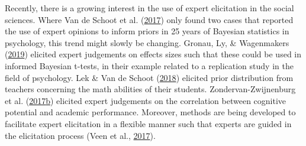 \documentclass[openright,titlepage,12pt,a4paper]{book}
\begin{document}
Recently, there is a growing interest in the use of expert elicitation in the social sciences. Where Van de Schoot et al. (\protect\hyperlink{ref-van_de_schoot_systematic_2017}{2017}) only found two cases that reported the use of expert opinions to inform priors in 25 years of Bayesian statistics in psychology, this trend might slowly be changing. Gronau, Ly, \& Wagenmakers (\protect\hyperlink{ref-gronau_informed_2019}{2019}) elicited expert judgements on effects sizes such that these could be used in informed Bayesian t-tests, in their example related to a replication study in the field of psychology. Lek \& Van de Schoot (\protect\hyperlink{ref-lek_development_2018}{2018}) elicited prior distribution from teachers concerning the math abilities of their students. Zondervan-Zwijnenburg et al. (\protect\hyperlink{ref-zondervan-zwijnenburg_application_2017}{2017}\protect\hyperlink{ref-zondervan-zwijnenburg_application_2017}{b}) elicited expert judgements on the correlation between cognitive potential and academic performance. Moreover, methods are being developed to facilitate expert elicitation in a flexible manner such that experts are guided in the elicitation process (Veen et al., \protect\hyperlink{ref-veen_proposal_2017}{2017}).
\end{document}
